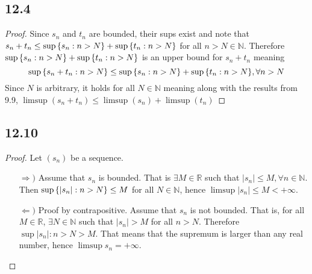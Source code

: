 \documentclass[12pt,titlepage]{extarticle}
\begin{document}
\subsection*{12.4}
\begin{proof}
    Since $s_n$ and $t_n$ are bounded, their sups exist and note that $s_n + t_n \leq \sup\qty{s_n : n > N} + \sup\qty{t_n : n > N}$ for all $n > N \in \mathbb{N}$. Therefore $\sup\qty{s_n : n > N} + \sup\qty{t_n : n > N}$ is an upper bound for $s_n + t_n$ meaning
    \[
        \sup\qty{s_n + t_n : n > N} \leq \sup\qty{s_n : n > N} + \sup\qty{t_n : n > N}, \forall n > N
    \]
    Since $N$ is arbitrary, it holds for all $N \in \mathbb{N}$ meaning along with the results from 9.9,
    $
        \limsup (s_n + t_n) \leq \limsup(s_n) + \limsup(t_n)
    $
\end{proof}

\subsection*{12.10}
\begin{proof}
    Let $(s_n)$ be a sequence.
    \begin{enumerate}
        \item[$\Rightarrow)$]
            Assume that $s_n$ is bounded. That is $\exists M \in \mathbb{R}$ such that $|s_n| \leq M, \forall n \in \mathbb{N}$. Then $\sup\qty{|s_n| : n > N} \leq M$ for all $N \in \mathbb{N}$, hence $\limsup |s_n| \leq M < +\infty$.
        \item[$\Leftarrow)$]
            Proof by contrapositive. Assume that $s_n$ is not bounded. That is, for all $M \in \mathbb{R}$, $\exists N \in \mathbb{N}$ such that $|s_n| > M$ for all $n > N$. Therefore $\sup{|s_n| : n > N} > M$. That means that the supremum is larger than any real number, hence $\limsup s_n = +\infty$.
    \end{enumerate}
\end{proof}
\end{document}
